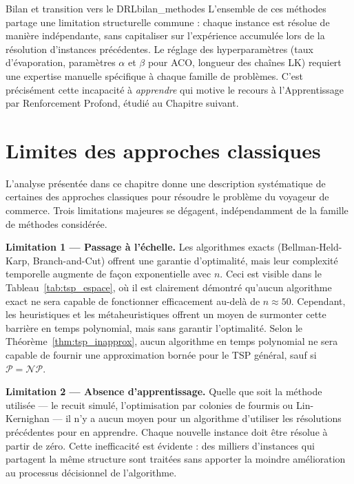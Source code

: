 \documentclass[12pt, a4paper, twoside, openright]{book}
\begin{document}
	\begin{remark}{Bilan et transition vers le DRL}{bilan_methodes}
		L'ensemble de ces méthodes partage une limitation structurelle commune :
		chaque instance est résolue de manière indépendante, sans capitaliser sur
		l'expérience accumulée lors de la résolution d'instances précédentes. Le
		réglage des hyperparamètres (taux d'évaporation, paramètres $\alpha$ et
		$\beta$ pour ACO, longueur des chaînes LK) requiert une expertise
		manuelle spécifique à chaque famille de problèmes. C'est précisément
		cette incapacité à \textit{apprendre} qui motive le recours à
		l'Apprentissage par Renforcement Profond, étudié au Chapitre suivant.
	\end{remark}
	
	\section{Limites des approches classiques}
	\label{sec:tsp_limites}
	
L'analyse présentée dans ce chapitre donne une description systématique de certaines des approches classiques pour résoudre le problème du voyageur de commerce. Trois limitations majeures se dégagent, indépendamment de la famille de méthodes considérée.

\textbf{Limitation 1 --- Passage à l'échelle.}
Les algorithmes exacts (Bellman-Held-Karp, Branch-and-Cut) offrent une garantie d'optimalité, mais leur complexité temporelle augmente de façon exponentielle avec $n$. Ceci est visible dans le Tableau~\ref{tab:tsp_espace}, où il est clairement démontré qu'aucun algorithme exact ne sera capable de fonctionner efficacement au-delà de $n \approx 50$. Cependant, les heuristiques et les métaheuristiques offrent un moyen de surmonter cette barrière en temps polynomial, mais sans garantir l'optimalité. Selon le Théorème~\ref{thm:tsp_inapprox}, aucun algorithme en temps polynomial ne sera capable de fournir une approximation bornée pour le TSP général, sauf si $\mathcal{P} = \mathcal{NP}$.

\textbf{Limitation 2 --- Absence d'apprentissage.}
Quelle que soit la méthode utilisée --- le recuit simulé, l'optimisation par colonies de fourmis ou Lin-Kernighan --- il n'y a aucun moyen pour un algorithme d'utiliser les résolutions précédentes pour en apprendre. Chaque nouvelle instance doit être résolue à partir de zéro. Cette inefficacité est évidente : des milliers d'instances qui partagent la même structure sont traitées sans apporter la moindre amélioration au processus décisionnel de l'algorithme.
\end{document}

